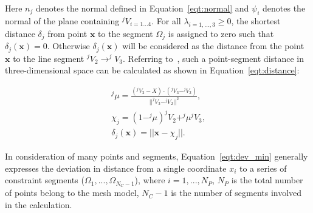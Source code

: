 Here $n_j$ denotes the normal defined in Equation~\ref{eqt:normal} and $\psi_i$ denotes the normal of the plane containing $^jV_{i=1...4}$.
For all $\lambda_{i=1,...,3} \ge 0$, the shortest distance $\delta_j$ from point $\boldsymbol{x}$ to the segment $\Omega_j$ is assigned to zero such that $\delta_j(\boldsymbol{x})=0$.
Otherwise $\delta_j(\boldsymbol{x})$ will be considered as the distance from the point $\boldsymbol{x}$ to the line segment $^jV_2 \rightarrow ^jV_3$.
Referring to~\cite{weisstein}, such a point-segment distance in three-dimensional space can be calculated as shown in Equation~\ref{eqt:distance}:

\begin{equation}
\begin{aligned}
^j\mu = \frac{(^jV_2-X)\cdot(^jV_3-^jV_2)}{||^jV_3-^jV_2||^2} \mbox{,} \\
\chi_j = (1-^j\mu)^jV_2 + ^j\mu^jV_3 \mbox{,} \\
\delta_{j}(\textbf{x}) = ||\textbf{x}-\chi_j|| \mbox{.}
\end{aligned}
\label{eqt:distance}
\end{equation}

In consideration of many points and segments, Equation~\ref{eqt:dev_min} generally expresses the deviation in distance from a single coordinate $x_i$ to a series of constraint segments ($\Omega_{1},...,\Omega_{N_C-1}$), where $i=1,...,N_P$, $N_P$ is the total number of points belong to the mesh model, $N_C-1$ is the number of segments involved in the calculation.




